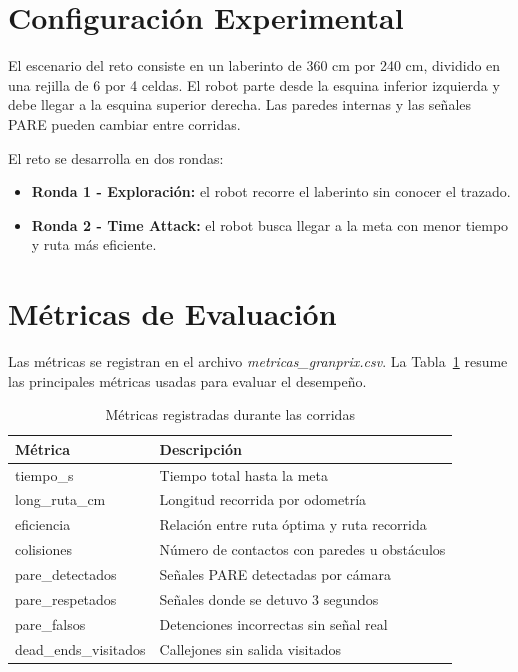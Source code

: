 \documentclass[conference]{IEEEtran}
\begin{document}
\section{Configuración Experimental}

El escenario del reto consiste en un laberinto de 360 cm por 240 cm, dividido en una rejilla de 6 por 4 celdas. El robot parte desde la esquina inferior izquierda y debe llegar a la esquina superior derecha. Las paredes internas y las señales PARE pueden cambiar entre corridas.

El reto se desarrolla en dos rondas:

\begin{itemize}
    \item \textbf{Ronda 1 - Exploración:} el robot recorre el laberinto sin conocer el trazado.
    \item \textbf{Ronda 2 - Time Attack:} el robot busca llegar a la meta con menor tiempo y ruta más eficiente.
\end{itemize}

\section{Métricas de Evaluación}

Las métricas se registran en el archivo \textit{metricas\_granprix.csv}. La Tabla~\ref{tab:metricas} resume las principales métricas usadas para evaluar el desempeño.

\begin{table}[!t]
\caption{Métricas registradas durante las corridas}
\label{tab:metricas}
\centering
\begin{tabular}{|l|l|}
\hline
\textbf{Métrica} & \textbf{Descripción} \\
\hline
tiempo\_s & Tiempo total hasta la meta \\
\hline
long\_ruta\_cm & Longitud recorrida por odometría \\
\hline
eficiencia & Relación entre ruta óptima y ruta recorrida \\
\hline
colisiones & Número de contactos con paredes u obstáculos \\
\hline
pare\_detectados & Señales PARE detectadas por cámara \\
\hline
pare\_respetados & Señales donde se detuvo 3 segundos \\
\hline
pare\_falsos & Detenciones incorrectas sin señal real \\
\hline
dead\_ends\_visitados & Callejones sin salida visitados \\
\hline
\end{tabular}
\end{table}
\end{document}
